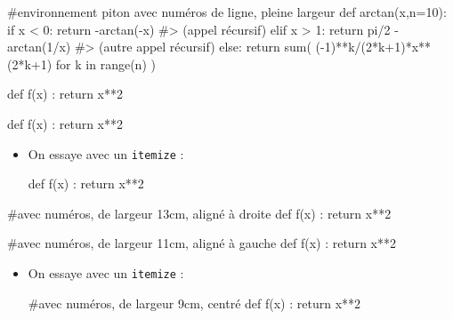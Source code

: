 \documentclass[a4paper,french,11pt]{article}
\begin{document}
\begin{codesortie}
\begin{CodePiton}
#environnement piton avec numéros de ligne, pleine largeur
def arctan(x,n=10):
	if x < 0:
		return -arctan(-x) #> (appel récursif)
	elif x > 1:
		return pi/2 - arctan(1/x) #> (autre appel récursif)
	else:
		return sum( (-1)**k/(2*k+1)*x**(2*k+1) for k in range(n) )
\end{CodePiton}
\end{codesortie}

\begin{codetex}
\begin{CodePiton}[Alignement=flush right,Largeur=13cm]
def f(x) :
	return x**2
\end{CodePiton}

\begin{CodePiton}[Alignement=flush left,Largeur=11cm]
def f(x) :
	return x**2
\end{CodePiton}

\begin{itemize} %
	\item On essaye avec un \texttt{itemize} :
	
	\begin{CodePiton}[Largeur=9cm]
		def f(x) :
			return x**2
	\end{CodePiton}
\end{itemize}
\end{codetex}

\begin{codesortie}
\begin{CodePiton}[Alignement=flush right,Largeur=13cm]
#avec numéros, de largeur 13cm, aligné à droite
def f(x) :
	return x**2
\end{CodePiton}

\begin{CodePiton}[Alignement=flush left,Largeur=11cm]
#avec numéros, de largeur 11cm, aligné à gauche
def f(x) :
	return x**2
\end{CodePiton}

\begin{itemize}
	\item On essaye avec un \texttt{itemize} :
	
	\begin{CodePiton}[Largeur=9cm]
		#avec numéros, de largeur 9cm, centré
		def f(x) :
			return x**2
	\end{CodePiton}
\end{itemize}
\end{codesortie}
\end{document}
